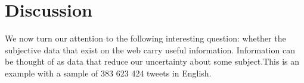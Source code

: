 \documentclass{acmtog} %
\begin{document}
\section{Discussion}
\label{sec:discussion}

We now turn our attention to the following interesting question: whether the subjective data that exist on the web carry useful information. Information can be thought of as data that reduce our uncertainty about some subject.This is an example with a sample of 383 623 424 tweets in English.

\begin{table}[h!]

\label{tab:cross_tab}
\end{table}
\end{document}
